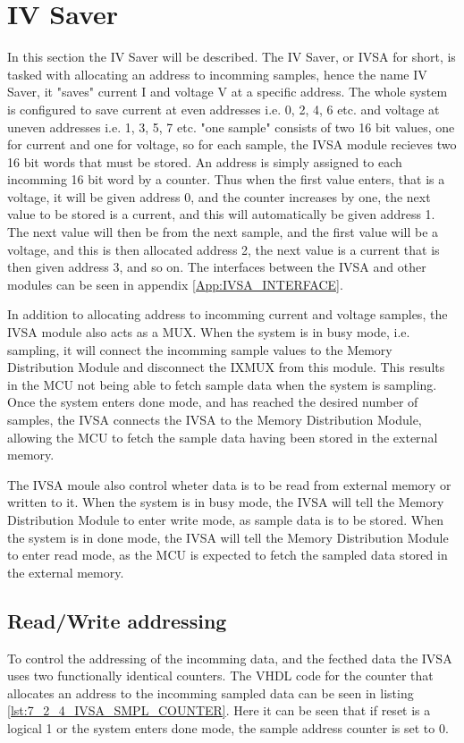 \section{IV Saver} \label{subsec:IVSA}
In this section the IV Saver will be described. The IV Saver, or IVSA for short, is tasked with allocating an address to incomming samples, hence the name IV Saver, it "saves" current I and voltage V at a specific address. The whole system is configured to save current at even addresses i.e. 0, 2, 4, 6 etc. and voltage at uneven addresses i.e. 1, 3, 5, 7 etc. "one sample" consists of two 16 bit values, one for current and one for voltage, so for each sample, the IVSA module recieves two 16 bit words that must be stored. An address is simply assigned to each incomming 16 bit word by a counter. Thus when the first value enters, that is a voltage, it will be given address 0, and the counter increases by one, the next value to be stored is a current, and this will automatically be given address 1. The next value will then be from the next sample, and the first value will be a voltage, and this is then allocated address 2, the next value is a current that is then given address 3, and so on. The interfaces between the IVSA and other modules can be seen in appendix \ref{App:IVSA_INTERFACE}.

In addition to allocating address to incomming current and voltage samples, the IVSA module also acts as a MUX. When the system is in busy mode, i.e. sampling, it will connect the incomming sample values to the Memory Distribution Module and disconnect the IXMUX from this module. This results in the MCU not being able to fetch sample data when the system is sampling. Once the system enters done mode, and has reached the desired number of samples, the IVSA connects the IVSA to the Memory Distribution Module, allowing the MCU to fetch the sample data having been stored in the external memory. 

The IVSA moule also control wheter data is to be read from external memory or written to it. When the system is in busy mode, the IVSA will tell the Memory Distribution Module to enter write mode, as sample data is to be stored. When the system is in done mode, the IVSA will tell the Memory Distribution Module to enter read mode, as the MCU is expected to fetch the sampled data stored in the external memory.

\subsection*{Read/Write addressing}
To control the addressing of the incomming data, and the fecthed data the IVSA uses two functionally identical counters. The VHDL code for the counter that allocates an address to the incomming sampled data can be seen in listing \ref{lst:7_2_4_IVSA_SMPL_COUNTER}. Here it can be seen that if reset is a logical 1 or the system enters done mode, the sample address counter is set to 0.

